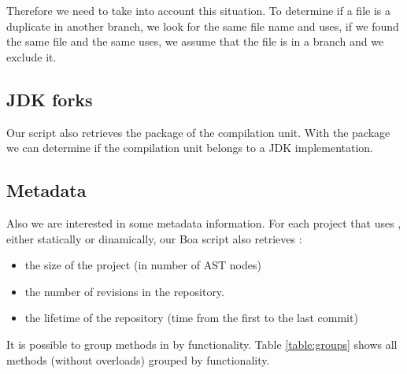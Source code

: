 Therefore we need to take into account this situation.
To determine if a file is a duplicate in another branch, we look for the same file name and uses, if we found the same file and the same uses, we assume that the file is in a branch and we exclude it.

\subsection{JDK forks}

Our script also retrieves the package of the compilation unit.
With the package we can determine if the compilation unit belongs to a JDK implementation.

\subsection{Metadata}

Also we are interested in some metadata information.
For each project that uses \smu{}, either statically or dinamically, our Boa script also retrieves :
\begin{itemize}
\item the size of the project (in number of AST nodes)
\item the number of revisions in the repository.
\item the lifetime of the repository (time from the first to the last commit)
\end{itemize}

It is possible to group methods in \smu{} by functionality.
Table \ref{table:groups} shows all methods (without overloads) grouped by functionality.



